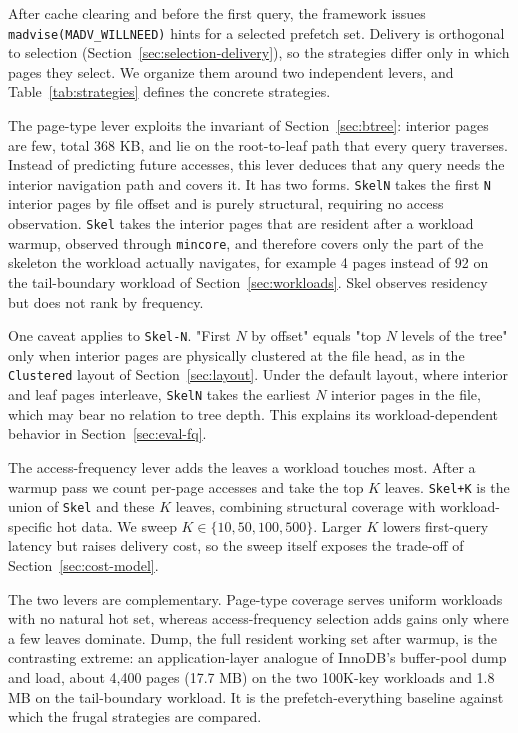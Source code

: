 \documentclass[sigconf, nonacm]{acmart}
\begin{document}
After cache clearing and before the first query, the framework issues \texttt{madvise(MADV\_WILLNEED)} hints for a selected prefetch set. Delivery is orthogonal to selection (Section~\ref{sec:selection-delivery}), so the strategies differ only in which pages they select. We organize them around two independent levers, and Table~\ref{tab:strategies} defines the concrete strategies.

The page-type lever exploits the invariant of Section~\ref{sec:btree}: interior pages are few, total 368 KB, and lie on the root-to-leaf path that every query traverses. Instead of predicting future accesses, this lever deduces that any query needs the interior navigation path and covers it. It has two forms. \texttt{Skel\-N} takes the first \texttt{N} interior pages by file offset and is purely structural, requiring no access observation. \texttt{Skel} takes the interior pages that are resident after a workload warmup, observed through \texttt{mincore}, and therefore covers only the part of the skeleton the workload actually navigates, for example 4 pages instead of 92 on the tail-boundary workload of Section~\ref{sec:workloads}. Skel observes residency but does not rank by frequency.

One caveat applies to \texttt{Skel-N}. "First $N$ by offset" equals "top $N$ levels of the tree" only when interior pages are physically clustered at the file head, as in the \texttt{Clustered} layout of Section~\ref{sec:layout}. Under the default layout, where interior and leaf pages interleave, \texttt{Skel\-N} takes the earliest $N$ interior pages in the file, which may bear no relation to tree depth. This explains its workload-dependent behavior in Section~\ref{sec:eval-fq}.

The access-frequency lever adds the leaves a workload touches most. After a warmup pass we count per-page accesses and take the top $K$ leaves. \texttt{Skel+K} is the union of \texttt{Skel} and these $K$ leaves, combining structural coverage with workload-specific hot data. We sweep $K \in \{10, 50, 100, 500\}$. Larger $K$ lowers first-query latency but raises delivery cost, so the sweep itself exposes the trade-off of Section~\ref{sec:cost-model}.

The two levers are complementary. Page-type coverage serves uniform workloads with no natural hot set, whereas access-frequency selection adds gains only where a few leaves dominate. Dump, the full resident working set after warmup, is the contrasting extreme: an application-layer analogue of InnoDB's buffer-pool dump and load, about 4,400 pages (17.7 MB) on the two 100K-key workloads and 1.8 MB on the tail-boundary workload. It is the prefetch-everything baseline against which the frugal strategies are compared.
\end{document}
